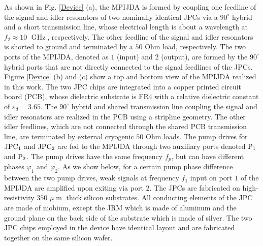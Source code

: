 \documentclass[aip,onecolumn,10pt]{revtex4}%
\begin{document}
As shown in Fig. \ref{Device} (a), the MPIJDA is formed by coupling one feedline of the signal and idler resonators of two nominally identical JPCs via a $90^{\circ}$ hybrid \cite{Pozar} and a short transmission line, whose electrical length is about a wavelength at $f_2\approx10$ $\operatorname{GHz}$, respectively. The other feedline of the signal and idler resonators is shorted to ground and terminated by a $50$ Ohm load, respectively. The two ports of the MPIJDA, denoted as $1$ (input) and $2$ (output), are formed by the $90^{\circ}$ hybrid ports that are not directly connected to the signal feedlines of the JPCs. Figure \ref{Device} (b) and (c) show a top and bottom view of the MPIJDA realized in this work. The two JPC chips are integrated into a copper printed circuit board (PCB), whose dielectric substrate is FR4 with a relative dielectric constant of $\varepsilon_d=3.65$. The $90^{\circ}$ hybrid and shared transmission line coupling the signal and idler resonators are realized in the PCB using a stripline geometry. The other idler feedlines, which are not connected through the shared PCB transmission line, are terminated by external cryogenic $50$ Ohm loads. The pump drives for $\rm{JPC_1}$ and $\rm{JPC_2}$ are fed to the MPIJDA through two auxiliary ports denoted $\rm{P_1}$ and $\rm{P_2}$. The pump drives have the same frequency $f_p$, but can have different phases $\varphi_1$ and $\varphi_2$. As we show below, for a certain pump phase difference between the two pump drives, weak signals at frequency $f_1$ input on port $1$ of the MPIJDA are amplified upon exiting via port $2$. The JPCs are fabricated on high-resistivity $350$ $\mu\operatorname{m}$ thick silicon substrates. All conducting elements of the JPC are made of niobium, except the JRM which is made of aluminum and the ground plane on the back side of the substrate which is made of silver. The two JPC chips employed in the device have identical layout and are fabricated together on the same silicon wafer.
\end{document}
